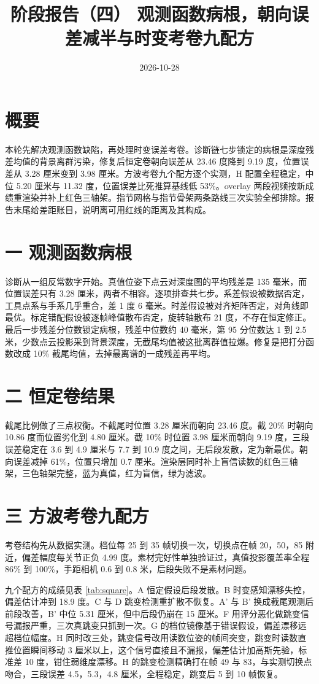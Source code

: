 \documentclass{article}
\title{阶段报告（四） 观测函数病根，朝向误差减半与时变考卷九配方}
\author{}
\date{2026-10-28}
\begin{document}
\maketitle

\section{概要}
本轮先解决观测函数缺陷，再处理时变误差考卷。诊断链七步锁定的病根是深度残差均值的背景离群污染，修复后恒定卷朝向误差从 23.46 度降到 9.19 度，位置误差从 3.28 厘米变到 3.98 厘米。方波考卷九个配方逐个实测，H 配置全程稳定，中位 5.20 厘米与 11.32 度，位置误差比死推算基线低 53\%。overlay 两段视频按新成绩重渲染并补上红色三轴架。指节网格与指节骨架两条路线三次实验全部排除。报告末尾给差距账目，说明离可用红线的距离及其构成。

\section{一 观测函数病根}
诊断从一组反常数字开始。真值位姿下点云对深度图的平均残差是 135 毫米，而位置误差只有 3.28 厘米，两者不相容。逐项排查共七步。系差假设被数据否定，工具点系与手系几乎重合，差 1 度 6 毫米。时差假设被对齐矩阵否定，对角线即最优。标定错配假设被逐帧峰值散布否定，旋转轴散布 21 度，不存在恒定修正。最后一步残差分位数锁定病根，残差中位数约 40 毫米，第 95 分位数达 1 到 2.5 米，少数点云投影采到背景深度，无截尾均值被这批离群值拉爆。修复是把打分函数改成 10\% 截尾均值，去掉最离谱的一成残差再平均。

\section{二 恒定卷结果}
截尾比例做了三点权衡。不截尾时位置 3.28 厘米而朝向 23.46 度。截 20\% 时朝向 10.86 度而位置劣化到 4.80 厘米。截 10\% 时位置 3.98 厘米而朝向 9.19 度，三段误差稳定在 3.6 到 4.9 厘米与 7.7 到 10.9 度之间，无后段发散，定为新最优。朝向误差减掉 61\%，位置只增加 0.7 厘米。渲染层同时补上盲信读数的红色三轴架，三色轴架完整，蓝为真值，红为盲信，绿为滤波。

\section{三 方波考卷九配方}
考卷结构先从数据实测。档位每 25 到 35 帧切换一次，切换点在帧 20，50，85 附近，偏差幅度每关节正负 4.99 度。素材完好性单独验证过，真值投影覆盖率全程 86\% 到 100\%，手距相机 0.6 到 0.8 米，后段失败不是素材问题。

九个配方的成绩见表 \ref{tab:square}。A 恒定假设后段发散。B 时变感知漂移失控，偏差估计冲到 18.9 度。C 与 D 跳变检测重扩散不恢复。A' 与 B' 换成截尾观测后前段改善，B' 中位 5.31 厘米，但中后段仍崩在 15 厘米。F 用评分恶化做跳变信号漏报严重，三次真跳变只抓到一次。G 的档位镜像基于错误假设，偏差漂移远超档位幅度。H 同时改三处，跳变信号改用读数位姿的帧间突变，跳变时读数直推位置瞬间移动 3 厘米以上，这个信号直接且不漏报，偏差估计加高斯先验，标准差 10 度，钳住弱维度漂移。H 的跳变检测精确打在帧 49 与 83，与实测切换点吻合，三段误差 4.5，5.3，4.8 厘米，全程稳定，跳变后 5 到 10 帧恢复。
\end{document}
